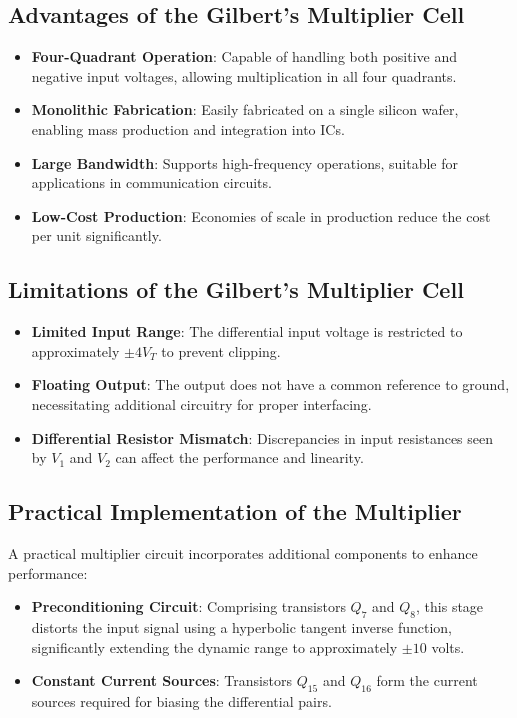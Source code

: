 \subsection{Advantages of the Gilbert's Multiplier Cell}
\begin{itemize}
    \item \textbf{Four-Quadrant Operation}: Capable of handling both positive and negative input voltages, allowing multiplication in all four quadrants.
    \item \textbf{Monolithic Fabrication}: Easily fabricated on a single silicon wafer, enabling mass production and integration into ICs.
    \item \textbf{Large Bandwidth}: Supports high-frequency operations, suitable for applications in communication circuits.
    \item \textbf{Low-Cost Production}: Economies of scale in production reduce the cost per unit significantly.
\end{itemize}

\subsection{Limitations of the Gilbert's Multiplier Cell}
\begin{itemize}
    \item \textbf{Limited Input Range}: The differential input voltage is restricted to approximately $\pm 4V_T$ to prevent clipping.
    \item \textbf{Floating Output}: The output does not have a common reference to ground, necessitating additional circuitry for proper interfacing.
    \item \textbf{Differential Resistor Mismatch}: Discrepancies in input resistances seen by $V_1$ and $V_2$ can affect the performance and linearity.
\end{itemize}

\subsection{Practical Implementation of the Multiplier}
A practical multiplier circuit incorporates additional components to enhance performance:
\begin{itemize}
    \item \textbf{Preconditioning Circuit}: Comprising transistors $Q_7$ and $Q_8$, this stage distorts the input signal using a hyperbolic tangent inverse function, significantly extending the dynamic range to approximately $\pm 10$ volts.
    \item \textbf{Constant Current Sources}: Transistors $Q_{15}$ and $Q_{16}$ form the current sources required for biasing the differential pairs.
\end{itemize}

